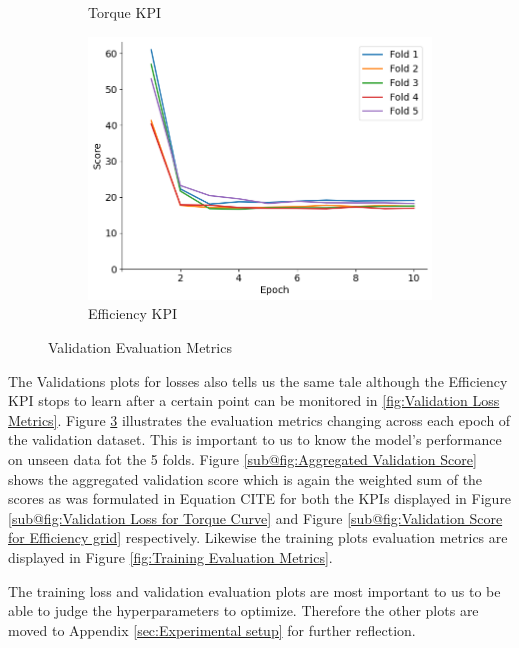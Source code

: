 \documentclass{report} %
\begin{document}
\begin{figure}[H]
\begin{subfigure}{0.32\textwidth}
        \caption{\centering Torque \ac{KPI}}
        \label{fig:Validation Score for Torque Curve}
    \end{subfigure}\hfill
    \begin{subfigure}{0.32\textwidth}
        \centering
        \includegraphics[width=\textwidth]{./ReportImages/val_score_y2.png}
        \caption{\centering Efficiency \ac{KPI}}
        \label{fig:Validation Score for Efficiency grid}
    \end{subfigure}
    \caption{Validation Evaluation Metrics}
    \label{fig:Validation Evaluation Metrics}
\end{figure} 

The Validations plots for losses also tells us the same tale although the Efficiency \ac{KPI} stops to learn after a certain point can be monitored in \ref{fig:Validation Loss Metrics}.
Figure \ref{fig:Validation Evaluation Metrics} illustrates the evaluation metrics changing across each epoch of the validation dataset. This is important to us to know 
the model's performance on unseen data fot the 5 folds. Figure \ref{sub@fig:Aggregated Validation Score} shows the aggregated validation score which is again the weighted 
sum of the scores as was formulated in Equation CITE for both the \ac{KPI}s displayed in Figure \ref{sub@fig:Validation Loss for Torque Curve} and Figure 
\ref{sub@fig:Validation Score for Efficiency grid} respectively. Likewise the training plots evaluation metrics are displayed in Figure \ref{fig:Training Evaluation Metrics}.

The training loss and validation evaluation plots are most important to us to be able to judge the hyperparameters to optimize. 
Therefore the other plots are moved to Appendix \ref{sec:Experimental setup} for further reflection.
\end{document}
